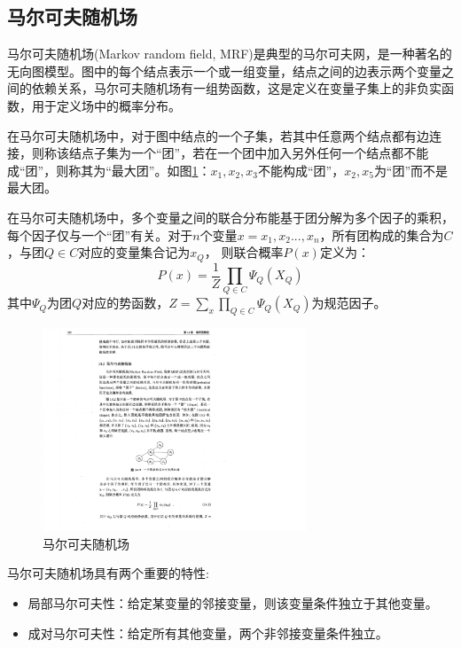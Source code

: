 \subsection{马尔可夫随机场}
马尔可夫随机场(Markov random field, MRF)是典型的马尔可夫网，是一种著名的无向图模型。图中的每个结点表示一个或一组变量，结点之间的边表示两个变量之间的依赖关系，马尔可夫随机场有一组势函数，这是定义在变量子集上的非负实函数，用于定义场中的概率分布。
\par 在马尔可夫随机场中，对于图中结点的一个子集，若其中任意两个结点都有边连接，则称该结点子集为一个“团”，若在一个团中加入另外任何一个结点都不能成“团”，则称其为“最大团”。如图\ref{mrf}：${x_1, x_2, x_3}$不能构成“团”，${x_2, x_5}$为“团”而不是最大团。
\par 在马尔可夫随机场中，多个变量之间的联合分布能基于团分解为多个因子的乘积，每个因子仅与一个“团”有关。对于$n$个变量$x = {x_1, x_2...,x_n}$，所有团构成的集合为$C$，与团$Q\in C$对应的变量集合记为$x_Q$， 则联合概率$P(x)$定义为：
$$P(x)=\frac{1}{Z} \prod_{Q\in C} \Psi_{Q}(X_{Q})$$
其中$ \Psi_{Q}$为团$Q$对应的势函数，$Z = \sum_x \prod_{Q\in C} \Psi_{Q}(X_{Q})$为规范因子。
\begin{figure}[htbp]
	\begin{center}
		\includegraphics[width=0.7\textwidth]{figures//4.pdf}
		\caption{马尔可夫随机场}
		\label{mrf}
	\end{center}
\end{figure}
\par 马尔可夫随机场具有两个重要的特性:
\begin{itemize}
	\item 局部马尔可夫性：给定某变量的邻接变量，则该变量条件独立于其他变量。
	\item 成对马尔可夫性：给定所有其他变量，两个非邻接变量条件独立。
\end{itemize}
